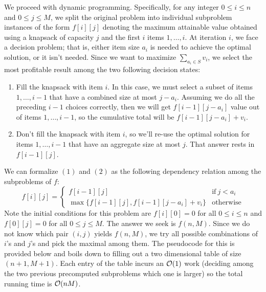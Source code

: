 \documentclass{article}
\begin{document}
\begin{enumerate}[leftmargin={*}, font={\bf}, label={\arabic*.}, ref={\arabic*}]
\begin{enumerate}
        We proceed with dynamic programming. Specifically, for any integer $0 \leq i \leq n$ and $0
        \leq j \leq M$, we split the original problem into individual subproblem instances of the
        form $f[i][j]$ denoting the maximum attainable value obtained using a knapsack of capacity
        $j$ and the first $i$ items $1, \ldots, i$. At iteration $i$, we face a decision problem;
        that is, either item size $a_i$ is needed to achieve the optimal solution, or it isn't needed.
        Since we want to maximize $\sum_{a_i \in S} v_i$, we select the most profitable result among
        the two following decision states:

        \begin{enumerate}[label={(\arabic*)}, itemsep={0pt}]
          \item
            Fill the knapsack with item $i$. In this case, we must select a subset of items $1, \ldots,
            i-1$ that have a combined size at most $j - a_i$. Assuming we do all the preceding $i-1$
            choices correctly, then we will get $f[i-1][j-a_i]$ value out of items $1, \ldots, i-1$,
            so the cumulative total will be $f[i-1][j-a_i] + v_i$.
          \item
            Don't fill the knapsack with item $i$, so we'll re-use the optimal solution for items $1,
            \ldots, i-1$ that have an aggregate size at most $j$. That answer rests in $f[i-1][j]$.
        \end{enumerate}

        We can formalize $(1)$ and $(2)$ as the following dependency relation among the subproblems
        of $f$:
        \[
          f[i][j] =
            \begin{cases}
              f[i-1][j] & \text{if}\ j < a_i \\
              \max\big\{f[i-1][j], f[i-1][j-a_i] + v_i\big\} & \text{otherwise}
            \end{cases}
        \]
        Note the initial conditions for this problem are $f[i][0] = 0$ for all $0 \leq i \leq n$ 
        and $f[0][j] = 0$ for all $0 \leq j \leq M$. The answer we seek is $f(n, M)$. Since we do
        not know which pair $(i,j)$ yields $f(n, M)$, we try all possible combinations of $i$'s and
        $j$'s and pick the maximal among them. The pseudocode for this is provided below and boils
        down to filling out a two dimensional table of size $(n+1, M+1)$. Each entry of the table
        incurs an $\operatorname*{\mathcal{O}}(1)$ work (deciding among the two previous precomputed subproblems which one
        is larger) so the total running time is $\operatorname*{\mathcal{O}}(nM)$.


\end{enumerate}
\end{enumerate}
\end{document}
